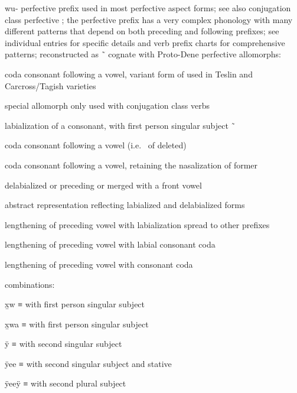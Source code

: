 \begin{morphdesc}[resume*=alphalist]
\item[wu-]\label{m:wu-}
	perfective prefix used in most perfective aspect forms;
	see also  conjugation class perfective ;
	the perfective prefix has a very complex phonology with many different patterns that depend
	on both	preceding and following prefixes;
	see individual entries for specific details and verb prefix charts for comprehensive patterns;
	reconstructed as  \~\  cognate with Proto-Dene  perfective
	\newline
	allomorphs:
	\begin{allolist}
	\item[\X{m-}]	coda consonant following a vowel, variant form of  used in Teslin
			and Carcross/Tagish varieties
	\item[{\X[u-pfv]{u-}}]
			special allomorph only used with  conjugation class verbs
	\item[{\X[ʷ-pfv]{ʷ-}}]
			labialization of a consonant, with first person singular subject  \~\ 
	\item[{\X[w-pfv]{w-}}]
			coda consonant following a vowel (i.e.\  of  deleted)
	\item[\X{w̃-}]	coda consonant following a vowel, retaining the nasalization of former 
	\item[{\X[ÿ-pfv]{ÿ-}}]
			delabialized  or  preceding or merged with a front vowel
	\item[\X{ÿu-}]	abstract representation reflecting labialized and delabialized forms
	\item[\X{μʷ-}]	lengthening of preceding vowel with labialization spread to other prefixes
	\item[\X{μw-}]	lengthening of preceding vowel with labial consonant coda
	\item[\X{μm-}]	lengthening of preceding vowel with  consonant coda
	\end{allolist}
	combinations:
	\begin{allolist}
	\item[x̱w]	≡  with first person singular subject \fm{x̱-}
	\item[x̱wa]	≡  with first person singular subject \fm{x̱a-}
	\item[ÿ]	≡  with second singular subject \X[i-2sg]{i-}
	\item[ÿee]	≡  with second singular subject \X[i-2sg]{i-}
			and stative \X{μ-}
	\item[ÿeeÿ]	≡  with second plural subject \X{ÿi-}

\end{allolist}
\end{morphdesc}
